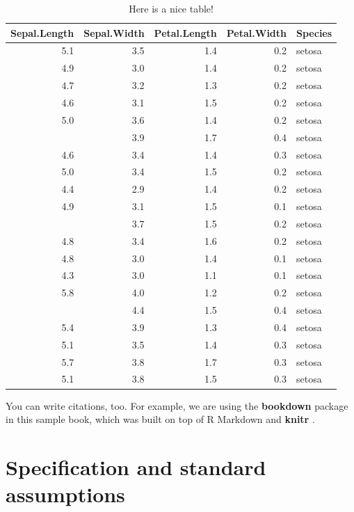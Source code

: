 \documentclass[
]{book}
\theoremstyle{definition}
\theoremstyle{definition}
\theoremstyle{definition}
\theoremstyle{definition}
\theoremstyle{remark}
\begin{document}
\begin{table}

\caption{\label{tab:nice-tab}Here is a nice table!}
\centering
\begin{tabular}[t]{rrrrl}
\toprule
Sepal.Length & Sepal.Width & Petal.Length & Petal.Width & Species\\
\midrule
5.1 & 3.5 & 1.4 & 0.2 & setosa\\
4.9 & 3.0 & 1.4 & 0.2 & setosa\\
4.7 & 3.2 & 1.3 & 0.2 & setosa\\
4.6 & 3.1 & 1.5 & 0.2 & setosa\\
5.0 & 3.6 & 1.4 & 0.2 & setosa\\
\addlinespace
5.4 & 3.9 & 1.7 & 0.4 & setosa\\
4.6 & 3.4 & 1.4 & 0.3 & setosa\\
5.0 & 3.4 & 1.5 & 0.2 & setosa\\
4.4 & 2.9 & 1.4 & 0.2 & setosa\\
4.9 & 3.1 & 1.5 & 0.1 & setosa\\
\addlinespace
5.4 & 3.7 & 1.5 & 0.2 & setosa\\
4.8 & 3.4 & 1.6 & 0.2 & setosa\\
4.8 & 3.0 & 1.4 & 0.1 & setosa\\
4.3 & 3.0 & 1.1 & 0.1 & setosa\\
5.8 & 4.0 & 1.2 & 0.2 & setosa\\
\addlinespace
5.7 & 4.4 & 1.5 & 0.4 & setosa\\
5.4 & 3.9 & 1.3 & 0.4 & setosa\\
5.1 & 3.5 & 1.4 & 0.3 & setosa\\
5.7 & 3.8 & 1.7 & 0.3 & setosa\\
5.1 & 3.8 & 1.5 & 0.3 & setosa\\
\bottomrule
\end{tabular}
\end{table}

You can write citations, too. For example, we are using the \textbf{bookdown} package \citep{R-bookdown} in this sample book, which was built on top of R Markdown and \textbf{knitr} \citep{xie2015}.

\hypertarget{specification-and-standard-assumptions}{%
\chapter{Specification and standard assumptions}\label{specification-and-standard-assumptions}}
\end{document}
